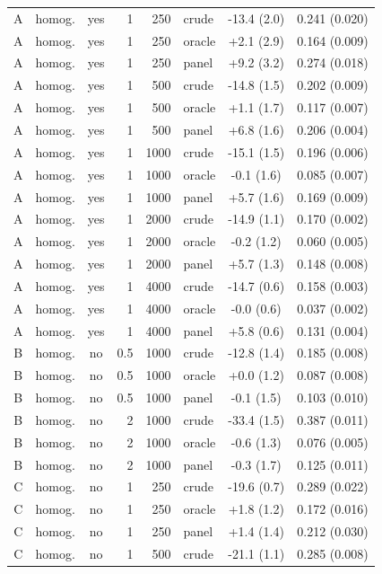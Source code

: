 \documentclass[11pt,a4paper]{article}
\begin{document}
\begin{longtable}{clcrrlcc}
A & homog. & yes & 1 & 250 & crude & -13.4 (2.0) & 0.241 (0.020) \\
A & homog. & yes & 1 & 250 & oracle & +2.1 (2.9) & 0.164 (0.009) \\
A & homog. & yes & 1 & 250 & panel & +9.2 (3.2) & 0.274 (0.018) \\
A & homog. & yes & 1 & 500 & crude & -14.8 (1.5) & 0.202 (0.009) \\
A & homog. & yes & 1 & 500 & oracle & +1.1 (1.7) & 0.117 (0.007) \\
A & homog. & yes & 1 & 500 & panel & +6.8 (1.6) & 0.206 (0.004) \\
A & homog. & yes & 1 & 1000 & crude & -15.1 (1.5) & 0.196 (0.006) \\
A & homog. & yes & 1 & 1000 & oracle & -0.1 (1.6) & 0.085 (0.007) \\
A & homog. & yes & 1 & 1000 & panel & +5.7 (1.6) & 0.169 (0.009) \\
A & homog. & yes & 1 & 2000 & crude & -14.9 (1.1) & 0.170 (0.002) \\
A & homog. & yes & 1 & 2000 & oracle & -0.2 (1.2) & 0.060 (0.005) \\
A & homog. & yes & 1 & 2000 & panel & +5.7 (1.3) & 0.148 (0.008) \\
A & homog. & yes & 1 & 4000 & crude & -14.7 (0.6) & 0.158 (0.003) \\
A & homog. & yes & 1 & 4000 & oracle & -0.0 (0.6) & 0.037 (0.002) \\
A & homog. & yes & 1 & 4000 & panel & +5.8 (0.6) & 0.131 (0.004) \\
B & homog. & no & 0.5 & 1000 & crude & -12.8 (1.4) & 0.185 (0.008) \\
B & homog. & no & 0.5 & 1000 & oracle & +0.0 (1.2) & 0.087 (0.008) \\
B & homog. & no & 0.5 & 1000 & panel & -0.1 (1.5) & 0.103 (0.010) \\
B & homog. & no & 2 & 1000 & crude & -33.4 (1.5) & 0.387 (0.011) \\
B & homog. & no & 2 & 1000 & oracle & -0.6 (1.3) & 0.076 (0.005) \\
B & homog. & no & 2 & 1000 & panel & -0.3 (1.7) & 0.125 (0.011) \\
C & homog. & no & 1 & 250 & crude & -19.6 (0.7) & 0.289 (0.022) \\
C & homog. & no & 1 & 250 & oracle & +1.8 (1.2) & 0.172 (0.016) \\
C & homog. & no & 1 & 250 & panel & +1.4 (1.4) & 0.212 (0.030) \\
C & homog. & no & 1 & 500 & crude & -21.1 (1.1) & 0.285 (0.008) \\

\end{longtable}
\end{document}
